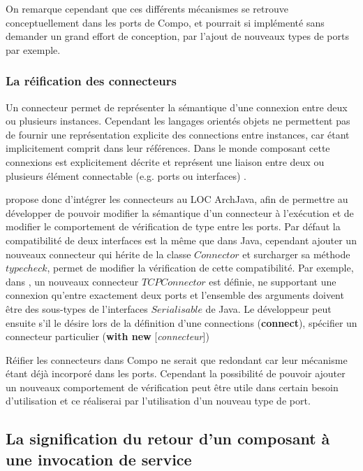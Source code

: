     On remarque cependant que ces différents mécanismes se retrouve conceptuellement dans les ports de Compo, et pourrait si implémenté sans demander un grand effort de conception, par l'ajout de nouveaux types de ports par exemple.
    
    \subsubsection{La réification des connecteurs}
       
    Un connecteur permet de représenter la sémantique d'une connexion entre deux ou plusieurs instances. Cependant les langages orientés objets ne permettent pas de fournir une représentation explicite des connections entre instances, car étant implicitement comprit dans leur références. Dans le monde composant cette connexions est explicitement décrite et représent une liaison entre deux ou plusieurs élément connectable (e.g. ports ou interfaces) \cite{IversDocumentingComponent2004}.
    
    \cite{aldrich2003language} propose donc d'intégrer les connecteurs au LOC ArchJava, afin de permettre au développer de pouvoir modifier la sémantique d'un connecteur à l’exécution et de modifier le comportement de vérification de type entre les ports. 
    Par défaut la compatibilité de deux interfaces est la même que dans Java, cependant ajouter un nouveaux connecteur qui hérite de la classe $Connector$ et surcharger sa méthode $typecheck$, permet de modifier la vérification de cette compatibilité. 
    Par exemple, dans \cite{aldrich2003language}, un nouveaux connecteur $TCPConnector$ est définie, ne supportant une conne\-xion qu'entre exactement deux ports et l'ensemble des arguments doivent être des sous-types de l'interfaces $Serialisable$ de Java. Le développeur peut ensuite s'il le désire lors de la définition d'une connections (\textbf{connect}), spécifier un connecteur particulier (\textbf{with new} [{\itshape connecteur}])
    
    Réifier les connecteurs dans Compo ne serait que redondant car leur mécanisme étant déjà incorporé dans les ports. Cependant la possibilité de pouvoir ajouter un nouveaux comportement de vérification peut être utile dans certain besoin d'utilisation et ce réaliserai par l'utilisation d'un nouveau type de port. 

  \subsection{La signification du retour d'un composant à une invocation de service}
  
